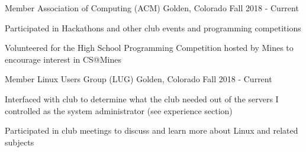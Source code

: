 \begin{cventries}

    \ifcv

    \cventry
    {Member}
    {Association of Computing (ACM)}
    {Golden, Colorado}
    {Fall 2018 - Current}
    {
      \begin{cvitems}
        \item Participated in Hackathons and other club events and programming competitions
        \item Volunteered for the High School Programming Competition hosted by Mines to encourage interest in CS@Mines
      \end{cvitems}
    }

    \cventry
    {Member}
    {Linux Users Group (LUG)}
    {Golden, Colorado}
    {Fall 2018 - Current}
    {
      \begin{cvitems}
        \item Interfaced with club to determine what the club needed out of the servers I controlled as the system administrator (see experience section)
        \item {Participated in club meetings to discuss and learn more about Linux and related subjects}
      \end{cvitems}
    }
    \fi

\end{cventries}
